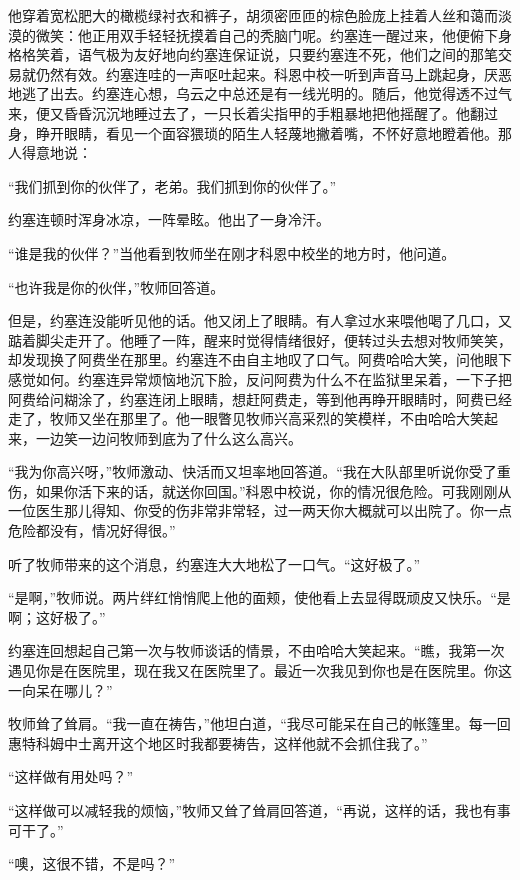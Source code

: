     他穿着宽松肥大的橄榄绿衬衣和裤子，胡须密匝匝的棕色脸庞上挂着人丝和蔼而淡漠的微笑：他正用双手轻轻抚摸着自己的秃脑门呢。约塞连一醒过来，他便俯下身格格笑着，语气极为友好地向约塞连保证说，只要约塞连不死，他们之间的那笔交易就仍然有效。约塞连哇的一声呕吐起来。科恩中校一听到声音马上跳起身，厌恶地逃了出去。约塞连心想，乌云之中总还是有一线光明的。随后，他觉得透不过气来，便又昏昏沉沉地睡过去了，一只长着尖指甲的手粗暴地把他摇醒了。他翻过身，睁开眼睛，看见一个面容猥琐的陌生人轻蔑地撇着嘴，不怀好意地瞪着他。那人得意地说：

    “我们抓到你的伙伴了，老弟。我们抓到你的伙伴了。”

    约塞连顿时浑身冰凉，一阵晕眩。他出了一身冷汗。

    “谁是我的伙伴？”当他看到牧师坐在刚才科恩中校坐的地方时，他问道。

    “也许我是你的伙伴，”牧师回答道。

    但是，约塞连没能听见他的话。他又闭上了眼睛。有人拿过水来喂他喝了几口，又踮着脚尖走开了。他睡了一阵，醒来时觉得情绪很好，便转过头去想对牧师笑笑，却发现换了阿费坐在那里。约塞连不由自主地叹了口气。阿费哈哈大笑，问他眼下感觉如何。约塞连异常烦恼地沉下脸，反问阿费为什么不在监狱里呆着，一下子把阿费给问糊涂了，约塞连闭上眼睛，想赶阿费走，等到他再睁开眼睛时，阿费已经走了，牧师又坐在那里了。他一眼瞥见牧师兴高采烈的笑模样，不由哈哈大笑起来，一边笑一边问牧师到底为了什么这么高兴。

    “我为你高兴呀，”牧师激动、快活而又坦率地回答道。“我在大队部里听说你受了重伤，如果你活下来的话，就送你回国。”科恩中校说，你的情况很危险。可我刚刚从一位医生那儿得知、你受的伤非常非常轻，过一两天你大概就可以出院了。你一点危险都没有，情况好得很。”

    听了牧师带来的这个消息，约塞连大大地松了一口气。“这好极了。”

    “是啊，”牧师说。两片绊红悄悄爬上他的面颊，使他看上去显得既顽皮又快乐。“是啊；这好极了。”

    约塞连回想起自己第一次与牧师谈话的情景，不由哈哈大笑起来。“瞧，我第一次遇见你是在医院里，现在我又在医院里了。最近一次我见到你也是在医院里。你这一向呆在哪儿？”

    牧师耸了耸肩。“我一直在祷告，”他坦白道，“我尽可能呆在自己的帐篷里。每一回惠特科姆中士离开这个地区时我都要祷告，这样他就不会抓住我了。”

    “这样做有用处吗？”

    “这样做可以减轻我的烦恼，”牧师又耸了耸肩回答道，“再说，这样的话，我也有事可干了。”

    “噢，这很不错，不是吗？”

